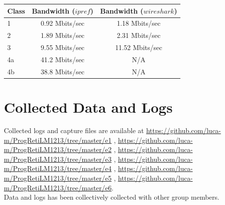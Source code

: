 \documentclass{llncs}
\begin{document}
\begin{center}
\begin{tabular}{ l || c | c }
   Class & Bandwidth ($ipref$) & Bandwidth ($wireshark$) \\  
  \hline                        
  1 & 0.92 Mbits/sec &  1.18 Mbits/sec \\
  2 & 1.89 Mbits/sec & 2.31 Mbits/sec \\
  3 & 9.55 Mbits/sec & 11.52 Mbits/sec \\
  4a & 41.2 Mbits/sec & N/A \\
  4b & 38.8 Mbits/sec & N/A \\
  \hline  
\end{tabular}
\end{center}





\appendix

\section{Collected Data and Logs}
Collected logs and capture files are available at \url{https://github.com/luca-m/ProgRetiLM1213/tree/master/e1} , \url{https://github.com/luca-m/ProgRetiLM1213/tree/master/e2} , \url{https://github.com/luca-m/ProgRetiLM1213/tree/master/e3} , \url{https://github.com/luca-m/ProgRetiLM1213/tree/master/e4} , \url{https://github.com/luca-m/ProgRetiLM1213/tree/master/e5} , \url{https://github.com/luca-m/ProgRetiLM1213/tree/master/e6}.\\
Data and logs has been collectively collected with other group members.
\end{document}
